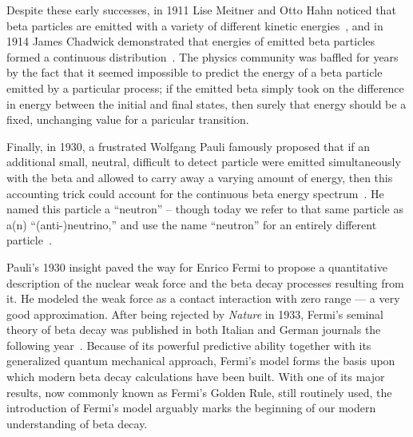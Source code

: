 Despite these early successes, in 1911 Lise Meitner and Otto Hahn noticed that beta particles are emitted with a variety of different kinetic energies~\cite{hahn1911new}, and in 1914 James Chadwick
demonstrated that energies of emitted beta particles formed a continuous distribution~\cite{chadwick1914}.  The physics community was baffled for years by the fact that it seemed impossible to predict the energy of a beta particle emitted by a particular process;  if the emitted beta simply took on the difference in energy between the initial and final states, then surely that energy should be a fixed, unchanging value for a paricular transition. 

Finally, in 1930, a frustrated Wolfgang Pauli famously proposed that if an additional small, neutral, difficult to detect particle were emitted simultaneously with the beta and allowed to carry away a varying amount of energy, then this accounting trick could account for the continuous beta energy spectrum~\cite{PauliNeutrino1978}.
He named this particle a ``neutron'' -- though today we refer to that same particle as a(n) ``(anti-)neutrino,'' and use the name ``neutron'' for an entirely different particle~\cite{PauliNeutrino1978}.  

Pauli's 1930 insight paved the way for Enrico Fermi to propose a quantitative description of the nuclear weak force and the beta decay processes resulting from it.  He modeled the weak force as a contact interaction with zero range --- a very good approximation.  After being rejected by \emph{Nature} in 1933, Fermi's seminal theory of beta decay was published in both Italian and German journals the following year~\cite{AbrahamPais,Fermi1934Italian,Fermi1934German}.
Because of its powerful predictive ability together with its generalized quantum mechanical approach, Fermi's model forms the basis upon which modern beta decay calculations have been built.  With one of its major results, now commonly known as Fermi's Golden Rule, still routinely used, the introduction of Fermi's model arguably marks the beginning of our modern understanding of beta decay.


